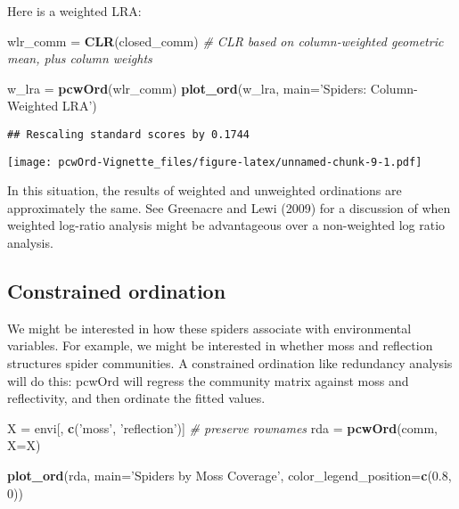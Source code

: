 \documentclass[
]{article}
\newenvironment{Shaded}{\begin{snugshade}}{\end{snugshade}}
\newcommand{\CommentTok}[1]{\textcolor[rgb]{0.56,0.35,0.01}{\textit{#1}}}
\newcommand{\DataTypeTok}[1]{\textcolor[rgb]{0.13,0.29,0.53}{#1}}
\newcommand{\DecValTok}[1]{\textcolor[rgb]{0.00,0.00,0.81}{#1}}
\newcommand{\FloatTok}[1]{\textcolor[rgb]{0.00,0.00,0.81}{#1}}
\newcommand{\KeywordTok}[1]{\textcolor[rgb]{0.13,0.29,0.53}{\textbf{#1}}}
\newcommand{\NormalTok}[1]{#1}
\newcommand{\StringTok}[1]{\textcolor[rgb]{0.31,0.60,0.02}{#1}}
\begin{document}
Here is a weighted LRA:

\begin{Shaded}
\begin{Highlighting}[]
\NormalTok{wlr_comm =}\StringTok{ }\KeywordTok{CLR}\NormalTok{(closed_comm) }\CommentTok{# CLR based on column-weighted geometric mean, plus column weights}

\NormalTok{w_lra =}\StringTok{ }\KeywordTok{pcwOrd}\NormalTok{(wlr_comm)}
\KeywordTok{plot_ord}\NormalTok{(w_lra, }
         \DataTypeTok{main=}\StringTok{'Spiders: Column-Weighted LRA'}\NormalTok{)}
\end{Highlighting}
\end{Shaded}

\begin{verbatim}
## Rescaling standard scores by 0.1744
\end{verbatim}

\texttt{[image: pcwOrd-Vignette\_files/figure-latex/unnamed-chunk-9-1.pdf]}

In this situation, the results of weighted and unweighted ordinations
are approximately the same. See Greenacre and Lewi (2009) for a
discussion of when weighted log-ratio analysis might be advantageous
over a non-weighted log ratio analysis.

\hypertarget{constrained-ordination}{%
\subsection{Constrained ordination}\label{constrained-ordination}}

We might be interested in how these spiders associate with environmental
variables. For example, we might be interested in whether moss and
reflection structures spider communities. A constrained ordination like
redundancy analysis will do this: pcwOrd will regress the community
matrix against moss and reflectivity, and then ordinate the fitted
values.

\begin{Shaded}
\begin{Highlighting}[]
\NormalTok{X =}\StringTok{ }\NormalTok{envi[, }\KeywordTok{c}\NormalTok{(}\StringTok{'moss'}\NormalTok{, }\StringTok{'reflection'}\NormalTok{)] }\CommentTok{# preserve rownames}
\NormalTok{rda =}\StringTok{ }\KeywordTok{pcwOrd}\NormalTok{(comm, }\DataTypeTok{X=}\NormalTok{X)}

\KeywordTok{plot_ord}\NormalTok{(rda, }
         \DataTypeTok{main=}\StringTok{'Spiders by Moss Coverage'}\NormalTok{, }
         \DataTypeTok{color_legend_position=}\KeywordTok{c}\NormalTok{(}\FloatTok{0.8}\NormalTok{, }\DecValTok{0}\NormalTok{))}
\end{Highlighting}
\end{Shaded}
\end{document}
